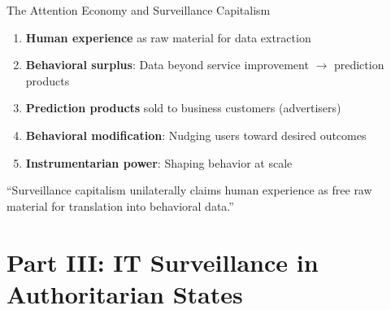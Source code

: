 ﻿\documentclass[aspectratio=169,11pt]{beamer}
\begin{document}
\begin{frame}{The Attention Economy and Surveillance Capitalism}
\begin{conceptbox}
\small
\begin{enumerate}
    \item \textbf{Human experience} as raw material for data extraction
    \item \textbf{Behavioral surplus}: Data beyond service improvement $\rightarrow$ prediction products
    \item \textbf{Prediction products} sold to business customers (advertisers)
    \item \textbf{Behavioral modification}: Nudging users toward desired outcomes
    \item \textbf{Instrumentarian power}: Shaping behavior at scale
\end{enumerate}
\end{conceptbox}

\vspace{0.2em}
\begin{quotebox}
\small
``Surveillance capitalism unilaterally claims human experience as free raw material for translation into behavioral data.''
\end{quotebox}
\end{frame}

\section{Part III: IT Surveillance in Authoritarian States}
\end{document}
